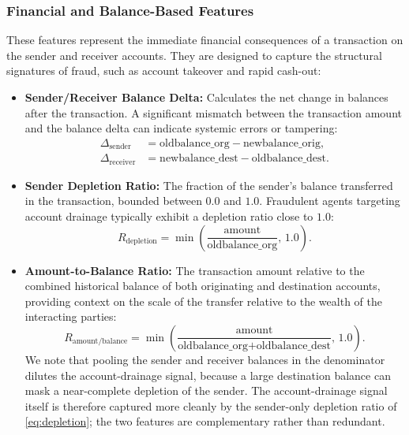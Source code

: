 \subsubsection{Financial and Balance-Based Features}
These features represent the immediate financial consequences of a transaction on the sender and receiver accounts. They are designed to capture the structural signatures of fraud, such as account takeover and rapid cash-out:
\begin{itemize}
    \item \textbf{Sender/Receiver Balance Delta:} Calculates the net change in balances after the transaction. A significant mismatch between the transaction amount and the balance delta can indicate systemic errors or tampering:
    \begin{align}
        \Delta_{\text{sender}}   &= \text{oldbalance\_org} - \text{newbalance\_orig}, \label{eq:delta-sender}\\
        \Delta_{\text{receiver}} &= \text{newbalance\_dest} - \text{oldbalance\_dest}. \label{eq:delta-receiver}
    \end{align}
    \item \textbf{Sender Depletion Ratio:} The fraction of the sender's balance transferred in the transaction, bounded between $0.0$ and $1.0$. Fraudulent agents targeting account drainage typically exhibit a depletion ratio close to $1.0$:
    \begin{equation}
        R_{\text{depletion}} = \min\left(\frac{\text{amount}}{\text{oldbalance\_org}},\, 1.0\right).
        \label{eq:depletion}
    \end{equation}
    \item \textbf{Amount-to-Balance Ratio:} The transaction amount relative to the combined historical balance of both originating and destination accounts, providing context on the scale of the transfer relative to the wealth of the interacting parties:
    \begin{equation}
        R_{\text{amount/balance}} = \min\left(\frac{\text{amount}}{\text{oldbalance\_org} + \text{oldbalance\_dest}},\, 1.0\right).
        \label{eq:amount-balance}
    \end{equation}
    We note that pooling the sender and receiver balances in the denominator dilutes the account-drainage signal, because a large destination balance can mask a near-complete depletion of the sender. The account-drainage signal itself is therefore captured more cleanly by the sender-only depletion ratio of \cref{eq:depletion}; the two features are complementary rather than redundant.

\end{itemize}
